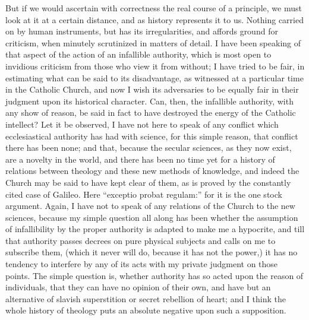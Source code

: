 But if we would ascertain with correctness the real course of a
principle, we must look at it at a certain distance, and as history
represents it to us. Nothing carried on by human instruments, but has
its irregularities, and affords ground for criticism, when minutely
scrutinized in matters of detail. I have been speaking of that aspect of
the action of an infallible authority, which is most open to invidious
criticism from those who view it from without; I have tried to be fair,
in estimating what can be said to its disadvantage, as witnessed at
a particular time in the Catholic Church, and now I wish its
adversaries to be equally fair in their judgment upon its historical
character. Can, then, the infallible authority, with any show of
reason, be said in fact to have destroyed the energy of the Catholic intellect? Let it be observed,
I have not here to speak of any conflict which ecclesiastical
authority has had with science, for this simple reason, that
conflict there has been none; and that, because the
secular sciences, as they now exist, are a novelty in the world, and
there has been no time yet for a history of relations between theology
and these new methods of knowledge, and indeed the Church may be said to
have kept clear of them, as is proved by the constantly cited case of
Galileo. Here ``exceptio probat regulam:'' for it is the one
stock argument. Again, I have not to speak of any relations of the
Church to the new sciences, because my simple question all along has
been whether the assumption of infallibility by the proper
authority is adapted to make me a hypocrite, and till that authority
passes decrees on pure physical subjects and calls on me to subscribe
them, (which it never will do, because it has not the power,) it
has no tendency to interfere by any of its acts
with my private judgment on those points. The simple question is, whether
authority has so acted upon the reason of individuals, that they can
have no opinion of their own, and have but an alternative of slavish
superstition or secret rebellion of heart; and I think the whole history
of theology puts an absolute negative upon such a supposition.

